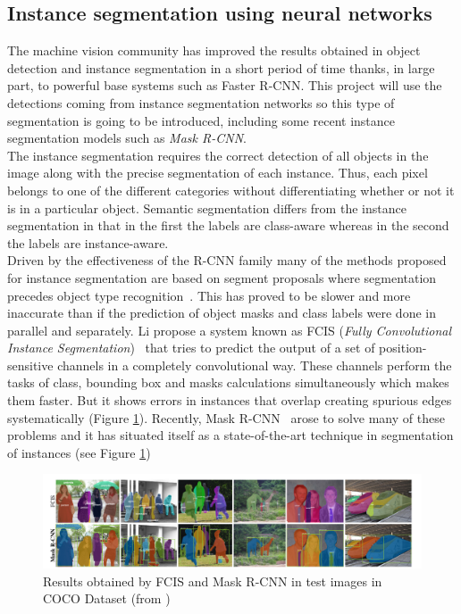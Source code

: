 \subsection{Instance segmentation using neural networks}
The machine vision community has improved the results obtained in object detection and instance segmentation in a short period of time thanks, in large part, to powerful base systems such as Faster R-CNN. This project will use the detections coming from instance segmentation networks so this type of segmentation is going to be introduced, including some recent instance segmentation models such as \textit{Mask R-CNN}.\\ The instance segmentation requires the correct detection of all objects in the image along with the precise segmentation of each instance. Thus, each pixel belongs to one of the different categories without differentiating whether or not it is in a particular object. Semantic segmentation differs from the instance segmentation in that in the first the labels are class-aware whereas in the second the labels are instance-aware.\\
Driven by the effectiveness of the R-CNN family many of the methods proposed for instance segmentation are based on segment proposals where segmentation precedes object type recognition~\cite{pinheiro2015learning}. This has proved to be slower and more inaccurate than if the prediction of object masks and class labels were done in parallel and separately. Li \etal{}propose a system known as FCIS (\textit{Fully Convolutional Instance Segmentation})~\cite{li2016fully} that tries to predict the output of a set of position-sensitive channels in a completely convolutional way. These channels perform the tasks of class, bounding box and masks calculations simultaneously which makes them faster. But it shows errors in instances that overlap creating spurious edges systematically (Figure \ref{fig:fcis_mask}).
Recently, Mask R-CNN~\cite{he2017mask} arose to solve many of these problems and it has situated itself as a state-of-the-art technique in segmentation of instances (see Figure \ref{fig:fcis_mask})\\
\begin{figure}[H]
\begin{center}
\includegraphics[scale=0.35]{previous_version/fcis_vs_maskrcnn.png}
\caption{Results obtained by FCIS and Mask R-CNN in test images in COCO Dataset (from \cite{he2017mask})}
\label{fig:fcis_mask}
\end{center}
\end{figure}

